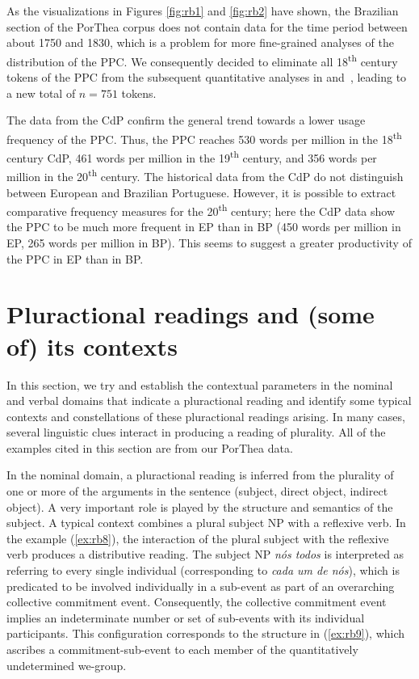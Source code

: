 \documentclass[output=paper,colorlinks,citecolor=brown]{langscibook}
\begin{document}
As the visualizations in Figures \ref{fig:rb1} and \ref{fig:rb2} have shown, the Brazilian section of the PorThea corpus does not contain data for the time period between about 1750 and 1830, which is a problem for more fine-grained analyses of the distribution of the PPC. We consequently decided to eliminate all 18\textsuperscript{th} century tokens of the PPC from the subsequent quantitative analyses in  and~, leading to a new total of $n = 751$ tokens.

The data from the CdP confirm the general trend towards a lower usage frequency of the PPC. Thus, the PPC reaches 530 words per million in the 18\textsuperscript{th} century CdP, 461 words per million in the 19\textsuperscript{th} century, and 356 words per million in the 20\textsuperscript{th} century. The historical data from the CdP do not distinguish between European and Brazilian Portuguese. However, it is possible to extract comparative frequency measures for the 20\textsuperscript{th} century; here the CdP data show the PPC to be much more frequent in EP than in BP (450 words per million in EP, 265 words per million in BP). This seems to suggest a greater productivity of the PPC in EP than in BP.

\section{Pluractional readings and (some of) its contexts}
\label{sec:rb4}
In this section, we try and establish the contextual parameters in the nominal and verbal domains that indicate a pluractional reading and identify some typical contexts and constellations of these pluractional readings arising. In many cases, several linguistic clues interact in producing a reading of plurality. All of the examples cited in this section are from our PorThea data.

In the nominal domain, a pluractional reading is inferred from the plurality of one or more of the arguments in the sentence (subject, direct object, indirect object). A very important role is played by the structure and semantics of the subject. A typical context combines a plural subject NP with a reflexive verb. In the example (\ref{ex:rb8}), the interaction of the plural subject with the reflexive verb produces a distributive reading. The subject NP \textit{nós todos} is interpreted as referring to every single individual (corresponding to \textit{cada um de nós}), which is predicated to be involved individually in a sub-event as part of an overarching collective commitment event. Consequently, the collective commitment event implies an indeterminate number or set of sub-events with its individual participants. This configuration corresponds to the structure in (\ref{ex:rb9}), which ascribes a commitment-sub-event to each member of the quantitatively undetermined we-group.
\end{document}

